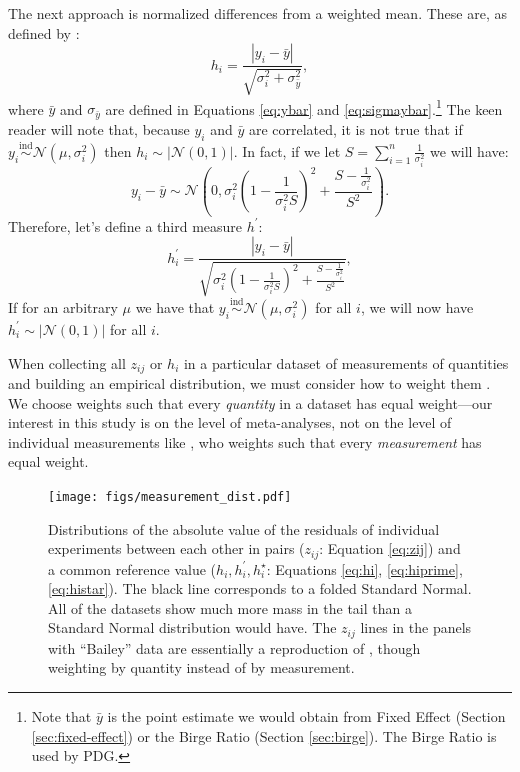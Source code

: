 \documentclass[letterpaper,12pt]{article}
\begin{document}
The next approach is normalized differences from a weighted mean. These are, as defined by \citet[eq.~3.3]{bailey2017not}:
\begin{equation}\label{eq:hi}
  h_i=\frac{|y_i-\bar{y}|}{\sqrt{\sigma_i^2+\sigma_{\bar{y}}^2}},
\end{equation}
where $\bar{y}$ and $\sigma_{\bar{y}}$ are defined in Equations \ref{eq:ybar} and \ref{eq:sigmaybar}.\footnote{Note that $\bar{y}$ is the point estimate we would obtain from Fixed Effect (Section \ref{sec:fixed-effect}) or the Birge Ratio (Section \ref{sec:birge}). The Birge Ratio is used by PDG.} The keen reader will note that, because $y_i$ and $\bar{y}$ are correlated, it is not true that if $y_i\overset{\mathrm{ind}}{\sim}\mathcal{N}(\mu,\sigma_i^2)$ then $h_i\sim|\mathcal{N}(0,1)|$. In fact, if we let $S=\sum_{i=1}^n \frac{1}{\sigma_i^2}$ we will have:
\[y_i-\bar{y}\sim \mathcal{N}\left(0, \sigma_i^2\left(1-\frac{1}{\sigma_i^2S}\right)^2+\frac{S-\frac{1}{\sigma_i^2}}{S^2}\right).\]
Therefore, let's define a third measure $h^\prime$:
\begin{equation}\label{eq:hiprime}
  h_i^\prime=\frac{|y_i-\bar{y}|}{\sqrt{\sigma_i^2\left(1-\frac{1}{\sigma_i^2S}\right)^2+\frac{S-\frac{1}{\sigma_i^2}}{S^2}}},
\end{equation}
If for an arbitrary $\mu$ we have that $y_i\overset{\mathrm{ind}}{\sim}\mathcal{N}(\mu,\sigma_i^2)$ for all $i$, we will now have $h_i^\prime\sim|\mathcal{N}(0,1)|$ for all $i$.

When collecting all $z_{ij}$ or $h_i$ in a particular dataset of measurements of quantities and building an empirical distribution, we must consider how to weight them \citep[sec.~3.3]{bailey2017not}. We choose weights such that every \textit{quantity} in a dataset has equal weight---our interest in this study is on the level of meta-analyses, not on the level of individual measurements like \citet{bailey2017not}, who weights such that every \textit{measurement} has equal weight.

\begin{figure}[htbp]
  \centering
  \texttt{[image: figs/measurement\_dist.pdf]}
  \caption{Distributions of the absolute value of the residuals of individual experiments between each other in pairs ($z_{ij}$: Equation \ref{eq:zij}) and a common reference value ($h_i,h_i^\prime,h_i^\star$: Equations \ref{eq:hi}, \ref{eq:hiprime}, \ref{eq:histar}). The black line corresponds to a folded Standard Normal. All of the datasets show much more mass in the tail than a Standard Normal distribution would have. The $z_{ij}$ lines in the panels with ``Bailey'' data are essentially a reproduction of \citet[fig.~2]{bailey2017not}, though weighting by quantity instead of by measurement.}
  \label{fig:measurement-dist}
\end{figure}
\end{document}
